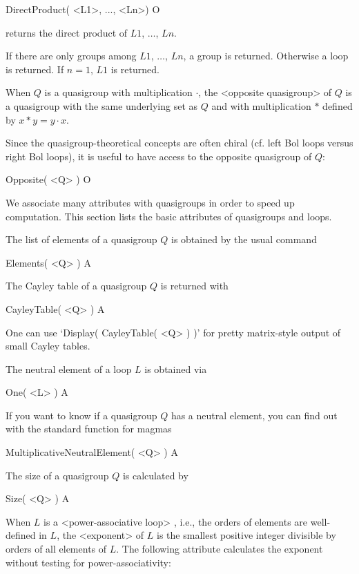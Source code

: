 \>DirectProduct( <L1>, ..., <Ln>) O

returns the direct product of $L1$, $\dots$, $Ln$.

If there are only groups among $L1$, $\dots$, $Ln$, a group is returned.
Otherwise a loop is returned. If $n=1$, $L1$ is returned.


When $Q$ is a quasigroup with multiplication $\cdot$, the <opposite quasigroup>
%
%
 of $Q$ is a quasigroup with the same underlying set as $Q$ and with
multiplication $*$ defined by $x*y=y\cdot x$.

Since the quasigroup-theoretical concepts are often chiral (cf. left Bol loops
versus right Bol loops), it is useful to have access to the opposite quasigroup
of $Q$:

\>Opposite( <Q> ) O


We associate many attributes with quasigroups in order to speed up computation.
This section lists the basic attributes of quasigroups and loops.

The list of elements of a quasigroup $Q$ is obtained by the usual command

\>Elements( <Q> ) A

The Cayley table of a quasigroup $Q$ is returned with

\>CayleyTable( <Q> ) A

One can use `Display( CayleyTable( <Q> ) )' for pretty matrix-style output of
small Cayley tables.

The neutral element of a loop $L$ is obtained via

\>One( <L> ) A

If you want to know if a quasigroup $Q$ has a neutral element, you can find out
with the standard function for magmas

\>MultiplicativeNeutralElement( <Q> ) A

The size of a quasigroup $Q$ is calculated by

\>Size( <Q> ) A

When $L$ is a <power-associative loop>
%
%
, i.e., the orders of elements are
well-defined in $L$, the <exponent>
%
%
 of $L$ is the smallest positive
integer divisible by orders of all elements of $L$. The following attribute
calculates the exponent without testing for power-associativity:

